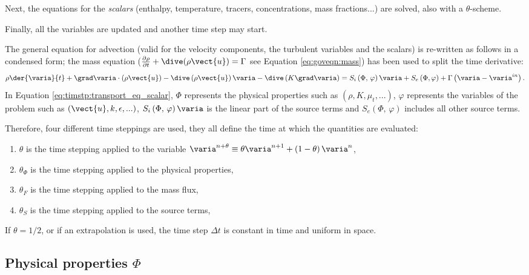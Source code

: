 Next, the equations for the \emph{scalars} (enthalpy, temperature, tracers,
concentrations, mass fractions...) are solved, also with a $\theta$-scheme.

Finally, all the variables are updated and another time step may start.

The general equation for advection (valid for the velocity components, the
turbulent variables and the scalars) is re-written as follows in a condensed
form; the mass equation ($\frac{\partial \rho } {\partial t}+ \dive(\rho
\vect{u}) = \Gamma$ see Equation \eqref{eq:goveqn:mass}) has been used to split the time derivative:
%
\begin{equation}\label{eq:timstp:transport_eq_scalar}
\rho \der{\varia}{t} + \grad \varia \cdot \left(\rho \vect{u} \right)
- \dive \left(\rho \vect{u} \right) \varia
- \dive \left(K \grad \varia \right) = S_{i}\left(\Phi, \, \varphi\right) \varia + S_{e}\left(\Phi,\varphi \right)
+ \Gamma \left( \varia - \varia^{in} \right).
\end{equation}
In Equation \eqref{eq:timstp:transport_eq_scalar}, $\Phi$ represents the physical properties such as $(\rho,K,\mu_{t},...)$,
$\varphi$ represents the variables of the problem such as $(\vect{u},k,\epsilon,...)$,
$S_{i}\left(\Phi, \, \varphi \right) \varia$ is the linear part of the source terms
and
$S_{e} \left(\Phi, \, \varphi \right)$  includes all other source terms.

Therefore, four different time steppings are used, they all define the time at which the quantities are evaluated:
%
\begin{enumerate}[ label=\roman{*}/, ref=(\roman{*})]
\item $\theta$ is the time stepping applied to the variable $\varia^{n+\theta} \equiv \theta \varia^{n+1} + \left( 1 - \theta \right) \varia^n$,
\item $\theta_\Phi$ is the time stepping applied to the physical properties,
\item $\theta_F$ is the time stepping applied to the mass flux,
\item $\theta_S$ is the time stepping applied to the source terms,
\end{enumerate}
%

If $\theta=1/2$, or if an extrapolation is used, the time step $\Delta t$ is
constant in time and uniform in space.

\subsection{Physical properties $\Phi$}

